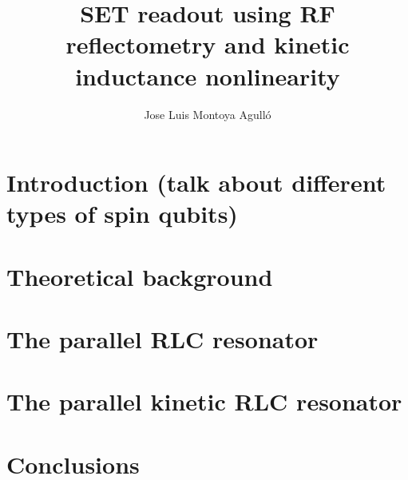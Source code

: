 \documentclass{article}
\title{
\textbf{SET readout using RF reflectometry and kinetic inductance nonlinearity}
}
\author{Jose Luis Montoya Agull\'o}
\date{}
\numberwithin{equation}{section}
\begin{document}
\maketitle
\begin{abstract}
\lipsum[1-1]
\end{abstract}


\newpage
\tableofcontents{}

\newpage
\section{Introduction (talk about different types of spin qubits)}
\label{sec:Intro}


\newpage
\section{Theoretical background}
\label{sec:Theory}


\newpage
\section{The parallel RLC resonator}
\label{sec:ParallelRLC}


\newpage
\section{The parallel kinetic RLC resonator}
\label{sec:KineticRLC}


\newpage
\section{Conclusions}
\label{sec:Conclusions}


%
% 
\end{document}
